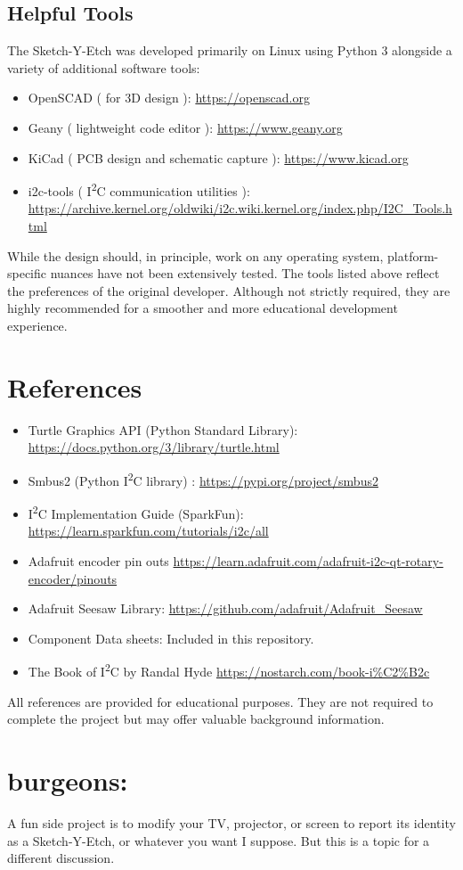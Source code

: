 \documentclass[]{article}
\begin{document}
\subsection*{Helpful Tools}

The Sketch-Y-Etch was developed primarily on Linux using Python 3 alongside a variety of additional software tools:

\begin{itemize}
	\item OpenSCAD ( for 3D design ): \url{https://openscad.org}
	\item Geany ( lightweight code editor ): \url{https://www.geany.org}
	\item KiCad ( PCB design and schematic capture ): \url{https://www.kicad.org}
	\item i2c-tools ( I\textsuperscript{2}C communication utilities ): \url{https://archive.kernel.org/oldwiki/i2c.wiki.kernel.org/index.php/I2C_Tools.html}
\end{itemize}

While the design should, in principle, work on any operating system, platform-specific nuances have not been extensively tested.  
The tools listed above reflect the preferences of the original developer. Although not strictly required, they are highly recommended for a smoother and more educational development experience.

\section*{References}

\begin{itemize}
	\item Turtle Graphics API (Python Standard Library): \url{https://docs.python.org/3/library/turtle.html}
	\item Smbus2 (Python I\textsuperscript{2}C library) : \url{https://pypi.org/project/smbus2}
	\item I\textsuperscript{2}C Implementation Guide (SparkFun): \url{https://learn.sparkfun.com/tutorials/i2c/all}
	\item Adafruit encoder pin outs \url{https://learn.adafruit.com/adafruit-i2c-qt-rotary-encoder/pinouts}
	\item Adafruit Seesaw Library: \url{https://github.com/adafruit/Adafruit_Seesaw}
	\item Component Data sheets: Included in this repository.
	\item The Book of I\textsuperscript{2}C by Randal Hyde \url{https://nostarch.com/book-i%C2%B2c}
\end{itemize}

All references are provided for educational purposes. They are not required to complete the project but may offer valuable background information.

\section*{burgeons:}
A fun side project is to modify your TV, projector, or screen to report its identity as a Sketch-Y-Etch, or whatever you want I suppose. But this is a topic for a different discussion.  
\end{document}
